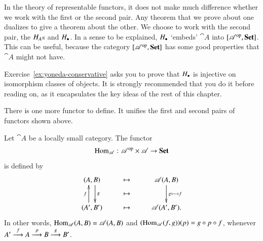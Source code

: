 In the theory of representable functors, it does not make much difference
whether we work with the first or the second pair.  Any theorem that we
prove about one dualizes to give a theorem about the other.  We choose to
work with the second pair, the $H_A$s and $H_\bullet$.  In a sense to be
explained, $H_\bullet$ `embeds' $\cat{A}$ into $[\mathscr{A}^{\mathrm{op}},\mathbf{Set}]$.
This can be useful, because the category $[\mathscr{A}^{\mathrm{op}},\mathbf{Set}]$ has
some good properties that $\cat{A}$ might not have.

Exercise~\ref{ex:yoneda-conservative} asks you to prove that $H_\bullet$ is
injective on isomorphism classes of objects.  It is strongly recommended
that you do it before reading on, as it encapsulates the key ideas of the
rest of this chapter.

There is one more functor to define.  It unifies the first and second pairs
of functors shown above.

\begin{defn}
Let $\cat{A}$ be a locally small category.  The functor
\[
\Hom_\cat{A}\from \cat{A}^\op \times \cat{A} \to \Set%
%
\index{hom-set}
%
\ntn{Hom-functor}
%
\]
is defined by
\[
\xymatrix{
(A, B) \ar@<1ex>[d]^g    &
\mapsto \ar@{}[d]|*+{\mapsto}       &
\cat{A}(A, B) \ar[d]^{g \of \dashbk \of f}      \\
(A', B') \ar@<1ex>[u]^f  &
\mapsto &
\cat{A}(A', B').
}
\]
In other words, $\operatorname{Hom}_{\mathscr{A}}(A, B) = \mathscr{A}(A, B)$ and $(\operatorname{Hom}_{\mathscr{A}}(f,
g))(p) = g \mathbin{\circ} p \mathbin{\circ} f$, whenever $A' \stackrel{f}{\longrightarrow} A \stackrel{p}{\longrightarrow} B \stackrel{g}{\longrightarrow} B'$.
\end{defn}

